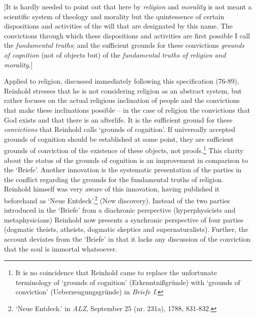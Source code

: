 [It is hardly needed to point out that here by \textit{religion }and \textit{morality }is not meant a scientific system of theology and morality but the quintessence of certain dispositions and activities of the will that are designated by this name. The convictions through which these dispositions and activities are first possible I call the \textit{fundamental truths}; and the sufficient grounds for these convictions \textit{grounds of cognition }(not of objects but) of the \textit{fundamental truths of religion and morality}.]

Applied to religion, discussed immediately following this specification (76{-}89), Reinhold stresses that he is not considering religion as an abstract system, but rather focuses on the actual religious inclination of people and the convictions that make these inclinations possible {--} in the case of religion the convictions that God exists and that there is an afterlife. It is the sufficient ground for these \textit{convictions} that Reinhold calls `grounds of cognition'. If universally accepted grounds of cognition should be established at some point, they are sufficient grounds of conviction of the existence of these objects, not proofs.\footnote{ It is no coincidence that Reinhold came to replace the unfortunate terminology of `grounds of cognition' (Erkenntni\ss{}gr\"{u}nde) with `grounds of conviction' (Ueberzeugungsgr\"{u}nde) in \textit{Briefe I}. } This clarity about the status of the grounds of cognition is an improvement in comparison to the `Briefe'. Another innovation is the systematic presentation of the parties in the conflict regarding the grounds for the fundamental truths of religion. Reinhold himself was very aware of this innovation, having published it beforehand as `Neue Entdeck'.\footnote{ `Neue Entdeck.' in \textit{ALZ}, September 25 (nr. 231a), 1788, 831{-}832. } (New discovery). Instead of the two parties introduced in the `Briefe' from a diachronic perspective (hyperphysicists and metaphysicians) Reinhold now presents a synchronic perspective of four parties (dogmatic theists, atheists, dogmatic skeptics and supernaturalists). Further, the account deviates from the `Briefe' in that it lacks any discussion of the conviction that the soul is immortal whatsoever. 

